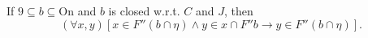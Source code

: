 If $9 \subseteq b \subseteq \mathrm{On}$ and $b$ is closed w.r.t. $C$ and $J$, then
$$(\forall x, y)[x \in F''(b \cap \eta) \land y \in x \cap F''b \rightarrow y \in F''(b \cap \eta)].$$
